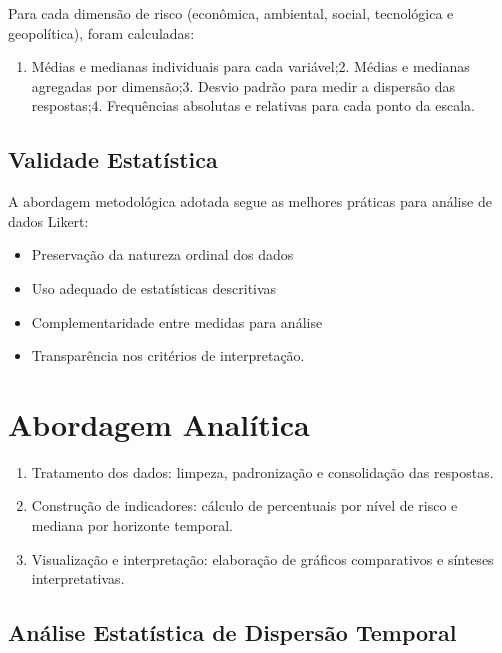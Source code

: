 \documentclass[
  portuguese,
  letterpaper,
  DIV=11,
  numbers=noendperiod]{scrreprt}
\providecommand{\tightlist}{%
  \setlength{\itemsep}{0pt}\setlength{\parskip}{0pt}}
\begin{document}
Para cada dimensão de risco (econômica, ambiental, social, tecnológica e
geopolítica), foram calculadas:

\begin{enumerate}
\def\labelenumi{\arabic{enumi}.}
\tightlist
\item
  Médias e medianas individuais para cada variável;2. Médias e medianas
  agregadas por dimensão;3. Desvio padrão para medir a dispersão das
  respostas;4. Frequências absolutas e relativas para cada ponto da
  escala.
\end{enumerate}

\subsection{Validade Estatística}\label{validade-estatuxedstica}

A abordagem metodológica adotada segue as melhores práticas para análise
de dados Likert:

\begin{itemize}
\tightlist
\item
  Preservação da natureza ordinal dos dados
\item
  Uso adequado de estatísticas descritivas
\item
  Complementaridade entre medidas para análise
\item
  Transparência nos critérios de interpretação.
\end{itemize}

\section{Abordagem Analítica}\label{abordagem-analuxedtica}

\begin{enumerate}
\def\labelenumi{\arabic{enumi}.}
\tightlist
\item
  Tratamento dos dados: limpeza, padronização e consolidação das
  respostas.
\item
  Construção de indicadores: cálculo de percentuais por nível de risco e
  mediana por horizonte temporal.
\item
  Visualização e interpretação: elaboração de gráficos comparativos e
  sínteses interpretativas.
\end{enumerate}

\subsection{Análise Estatística de Dispersão
Temporal}\label{anuxe1lise-estatuxedstica-de-dispersuxe3o-temporal}
\end{document}
